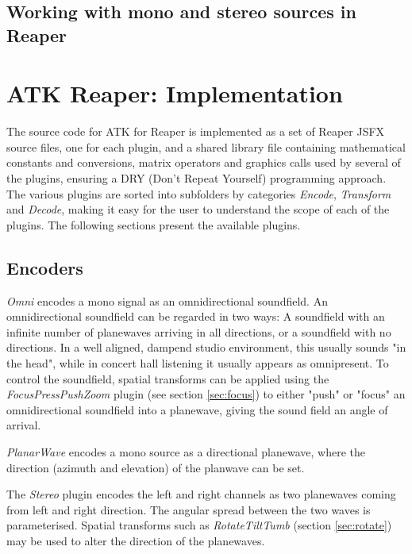 \documentclass{article}
\begin{document}
\subsection{Working with mono and stereo sources in Reaper}


\section{ATK Reaper: Implementation}\label{sec:implementation}

The source code for ATK for Reaper is implemented as a set of Reaper JSFX source files, one for each plugin, and a shared library file containing mathematical constants and conversions, matrix operators and graphics calls used by several of the plugins, ensuring a DRY (Don't Repeat Yourself) programming approach.
The various plugins are sorted into subfolders by categories \emph{Encode}, \emph{Transform} and \emph{Decode}, making it easy for the user to understand the scope of each of the plugins. 
The following sections present the available plugins.


\subsection{Encoders}\label{sec:encoders}

\emph{Omni} encodes a mono signal as an omnidirectional soundfield.
An omnidirectional soundfield can be regarded in two ways:
A soundfield with an infinite number of plane\-waves arriving in all directions, or a soundfield with no directions. In a well aligned, dampend studio environment, this usually sounds "in the head", while in concert hall listening it usually appears as omnipresent.
To control the soundfield, spatial transforms can be applied using the \emph{FocusPressPushZoom} plugin (see section \ref{sec:focus}) to either "push" or "focus" an omnidirectional soundfield into a plane\-wave, giving the sound field an angle of arrival.

\emph{PlanarWave} encodes a mono source as a directional plane\-wave, where the direction (azimuth and elevation) of the planwave can be set.

The \emph{Stereo} plugin encodes the left and right channels as two planewaves coming from left and right direction. The angular spread between the two waves is parameterised.
Spatial transforms such as \emph{RotateTiltTumb} (section \ref{sec:rotate}) may be used to alter the direction of the planewaves.
\end{document}
